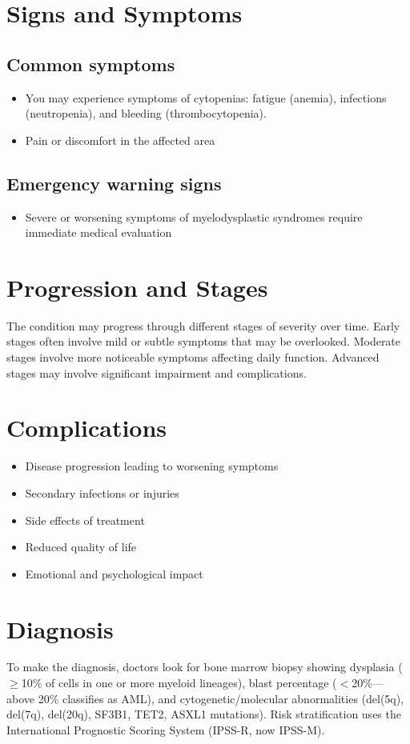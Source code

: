 \section{Signs and Symptoms}

\subsection{Common symptoms}
\begin{itemize}[noitemsep]
  \item You may experience symptoms of cytopenias: fatigue (anemia), infections (neutropenia), and bleeding (thrombocytopenia).
  \item Pain or discomfort in the affected area
  \end{itemize}

\subsection{Emergency warning signs}
\begin{itemize}[noitemsep]
  \item Severe or worsening symptoms of myelodysplastic syndromes require immediate medical evaluation
\end{itemize}
\section{Progression and Stages}
The condition may progress through different stages of severity over time. Early stages often involve mild or subtle symptoms that may be overlooked. Moderate stages involve more noticeable symptoms affecting daily function. Advanced stages may involve significant impairment and complications.
\section{Complications}
\begin{itemize}[noitemsep]
  \item Disease progression leading to worsening symptoms
  \item Secondary infections or injuries
  \item Side effects of treatment
  \item Reduced quality of life
  \item Emotional and psychological impact
\end{itemize}
\section{Diagnosis}
To make the diagnosis, doctors look for bone marrow biopsy showing dysplasia ($\geq$10\% of cells in one or more myeloid lineages), blast percentage ($<$20\%---above 20\% classifies as AML), and cytogenetic/molecular abnormalities (del(5q), del(7q), del(20q), SF3B1, TET2, ASXL1 mutations). Risk stratification uses the International Prognostic Scoring System (IPSS-R, now IPSS-M).

